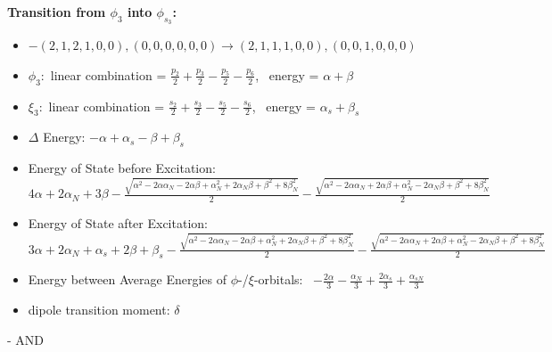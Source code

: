 \documentclass[12pt,a4paper]{article}
\begin{document}
        \noindent\textbf{Transition from $\phi_{3}$ into $\phi_{s_{3}}$:}
        \begin{itemize}
            \item $- (2, 1, 2, 1, 0, 0), (0, 0, 0, 0, 0, 0) \rightarrow (2, 1, 1, 1, 0, 0), (0, 0, 1, 0, 0, 0)$
        
            \item $\phi_{3}:$ linear combination = $\frac{p_{2}}{2} + \frac{p_{3}}{2} - \frac{p_{5}}{2} - \frac{p_{6}}{2}$, \
            energy = $\alpha + \beta$
            
            \item $\xi_{3}:$ linear combination = $\frac{s_{2}}{2} + \frac{s_{3}}{2} - \frac{s_{5}}{2} - \frac{s_{6}}{2}$, \
            energy = $\alpha_{s} + \beta_{s}$
            
            \item $\Delta$ Energy: $- \alpha + \alpha_{s} - \beta + \beta_{s}$
            \item Energy of State before Excitation: $4 \alpha + 2 \alpha_{N} + 3 \beta - \frac{\sqrt{\alpha^{2} - 2 \alpha \alpha_{N} - 2 \alpha \beta + \alpha_{N}^{2} + 2 \alpha_{N} \beta + \beta^{2} + 8 \beta_{N}^{2}}}{2} - \frac{\sqrt{\alpha^{2} - 2 \alpha \alpha_{N} + 2 \alpha \beta + \alpha_{N}^{2} - 2 \alpha_{N} \beta + \beta^{2} + 8 \beta_{N}^{2}}}{2}$
            \item Energy of State after Excitation: $3 \alpha + 2 \alpha_{N} + \alpha_{s} + 2 \beta + \beta_{s} - \frac{\sqrt{\alpha^{2} - 2 \alpha \alpha_{N} - 2 \alpha \beta + \alpha_{N}^{2} + 2 \alpha_{N} \beta + \beta^{2} + 8 \beta_{N}^{2}}}{2} - \frac{\sqrt{\alpha^{2} - 2 \alpha \alpha_{N} + 2 \alpha \beta + \alpha_{N}^{2} - 2 \alpha_{N} \beta + \beta^{2} + 8 \beta_{N}^{2}}}{2}$
            \item Energy between Average Energies of $\phi$-/$\xi$-orbitals: \
            $- \frac{2 \alpha}{3} - \frac{\alpha_{N}}{3} + \frac{2 \alpha_{s}}{3} + \frac{\alpha_{s N}}{3}$
        
            \item dipole transition moment: $\delta$
        
        \end{itemize}
        
 -  AND 
\end{document}
